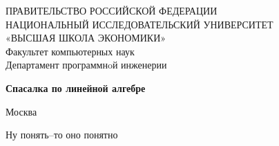 \documentclass[a4paper,12pt]{article}
\begin{document}

\begin{titlepage}
\begin{center}
\vspace*{0.7cm}
{\large ПРАВИТЕЛЬСТВО РОССИЙСКОЙ ФЕДЕРАЦИИ \\
НАЦИОНАЛЬНЫЙ ИССЛЕДОВАТЕЛЬСКИЙ УНИВЕРСИТЕТ \\
«ВЫСШАЯ ШКОЛА ЭКОНОМИКИ» }\\
\vspace*{0.2cm}
Факультет компьютерных наук \\
\smallskip
{\small Департамент программнoй инженерии \\
}
\vspace{1cm}

{\textbf{Спасалка по линейной алгебре}} \\
\medskip

Москва \number\year \\
\end{center}
\end{titlepage}

\newpage

{\large Ну понять–то оно понятно}

\newpage
\tableofcontents
{}

\newpage

\end{document}
